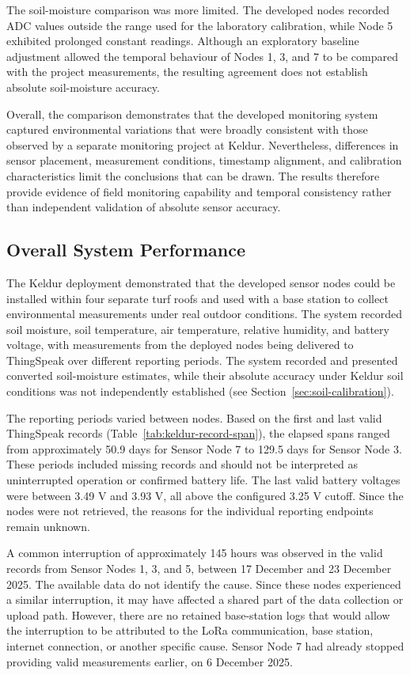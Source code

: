 The soil-moisture comparison was more limited. The developed nodes recorded ADC values outside the range used for the laboratory calibration, while Node 5 exhibited prolonged constant readings. Although an exploratory baseline adjustment allowed the temporal behaviour of Nodes 1, 3, and 7 to be compared with the project measurements, the resulting agreement does not establish absolute soil-moisture accuracy.

Overall, the comparison demonstrates that the developed monitoring system captured environmental variations that were broadly consistent with those observed by a separate monitoring project at Keldur. Nevertheless, differences in sensor placement, measurement conditions, timestamp alignment, and calibration characteristics limit the conclusions that can be drawn. The results therefore provide evidence of field monitoring capability and temporal consistency rather than independent validation of absolute sensor accuracy.

\subsection{Overall System
Performance}\label{sec:keldur-overall}

The Keldur deployment demonstrated that the developed sensor nodes could be installed within four separate turf roofs and used with a base station to collect environmental measurements under real outdoor conditions. The system recorded soil moisture, soil temperature, air temperature, relative humidity, and battery voltage, with measurements from the deployed nodes being delivered to ThingSpeak over different reporting periods. The system recorded and presented converted soil-moisture estimates, while their absolute accuracy under Keldur soil conditions was not independently established (see Section~\ref{sec:soil-calibration}).

The reporting periods varied between nodes. Based on the first and last valid ThingSpeak records (Table~\ref{tab:keldur-record-span}), the elapsed spans ranged from approximately 50.9 days for Sensor Node 7 to 129.5 days for Sensor Node 3. These periods included missing records and should not be interpreted as uninterrupted operation or confirmed battery life. The last valid battery voltages were between 3.49 V and 3.93 V, all above the configured 3.25 V cutoff. Since the nodes were not retrieved, the reasons for the individual reporting endpoints remain unknown.

A common interruption of approximately 145 hours was observed in the valid records from Sensor Nodes 1, 3, and 5, between 17 December and 23 December 2025. The available data do not identify the cause. Since these nodes experienced a similar interruption, it may have affected a shared part of the data collection or upload path. However, there are no retained base-station logs that would allow the interruption to be attributed to the LoRa communication, base station, internet connection, or another specific cause. Sensor Node 7 had already stopped providing valid measurements earlier, on 6 December 2025.


